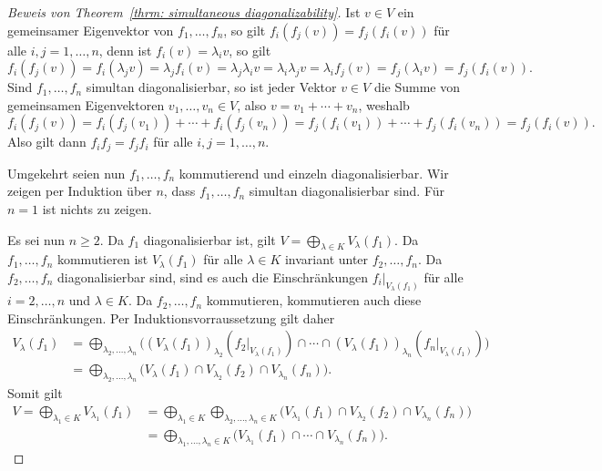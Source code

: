 \begin{proof}[Beweis von Theorem~\ref{thrm: simultaneous diagonalizability}]
  Ist $v \in V$ ein gemeinsamer Eigenvektor von $f_1, \dotsc, f_n$, so gilt $f_i(f_j(v)) = f_j(f_i(v))$ für alle $i, j = 1, \dotsc, n$, denn ist $f_i(v) = \lambda_i v$, so gilt
  \[
    f_i(f_j(v))
    = f_i(\lambda_j v)
    = \lambda_j f_i(v)
    = \lambda_j \lambda_i v
    = \lambda_i \lambda_j v
    = \lambda_i f_j(v)
    = f_j(\lambda_i v)
    = f_j(f_i(v)).
  \]
  Sind $f_1, \dotsc, f_n$ simultan diagonalisierbar, so ist jeder Vektor $v \in V$ die Summe von gemeinsamen Eigenvektoren $v_1, \dotsc, v_n \in V$, also $v = v_1 + \dotsb + v_n$, weshalb
  \[
    f_i(f_j(v))
    = f_i(f_j(v_1)) + \dotsb + f_i(f_j(v_n))
    = f_j(f_i(v_1)) + \dotsb + f_j(f_i(v_n))
    = f_j(f_i(v)).
  \]
  Also gilt dann $f_i f_j = f_j f_i$ für alle $i, j = 1, \dotsc, n$.

  Umgekehrt seien nun $f_1, \dotsc, f_n$ kommutierend und einzeln diagonalisierbar.
  Wir zeigen per Induktion über $n$, dass $f_1, \dotsc, f_n$ simultan diagonalisierbar sind.
  Für $n = 1$ ist nichts zu zeigen.
  
  Es sei nun $n \geq 2$.
  Da $f_1$ diagonalisierbar ist, gilt $V = \bigoplus_{\lambda \in K} V_\lambda(f_1)$.
  Da $f_1, \dotsc, f_n$ kommutieren ist $V_\lambda(f_1)$ für alle $\lambda \in K$ invariant unter $f_2, \dotsc, f_n$.
  Da $f_2, \dotsc, f_n$ diagonalisierbar sind, sind es auch die Einschränkungen $f_i|_{V_\lambda(f_1)}$ für alle $i = 2, \dotsc, n$ und $\lambda \in K$.
  Da $f_2, \dotsc, f_n$ kommutieren, kommutieren auch diese Einschränkungen.
  Per Induktionsvorraussetzung gilt daher
  \begin{align*}
        V_\lambda(f_1)
    &=  \bigoplus_{\lambda_2, \dotsc, \lambda_n}
        \bigg(
          ( V_\lambda(f_1) )_{\lambda_2}(f_2|_{V_\lambda(f_1)})
          \cap \dotsb \cap
          ( V_\lambda(f_1) )_{\lambda_n}(f_n|_{V_\lambda(f_1)})
        \bigg)
    \\
    &=  \bigoplus_{\lambda_2, \dotsc, \lambda_n}
        \bigg(
          V_\lambda(f_1) \cap V_{\lambda_2}(f_2) \cap V_{\lambda_n}(f_n)
        \bigg).
  \end{align*}
  Somit gilt
  \begin{align*}
      V
    =   \bigoplus_{\lambda_1 \in K} V_{\lambda_1}(f_1)
    &=  \bigoplus_{\lambda_1 \in K} \bigoplus_{\lambda_2, \dotsc, \lambda_n \in K}
        \bigg(
          V_{\lambda_1}(f_1) \cap V_{\lambda_2}(f_2) \cap V_{\lambda_n}(f_n)
        \bigg)
    \\
    &=  \bigoplus_{\lambda_1, \dotsc, \lambda_n \in K}
        \bigg(
          V_{\lambda_1}(f_1) \cap \dotsb \cap V_{\lambda_n}(f_n)
        \bigg).
  \end{align*}
\end{proof}







